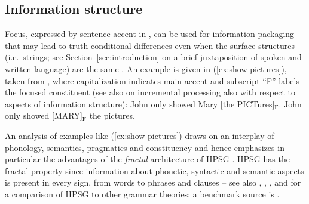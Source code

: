 \documentclass[output=paper
 	        ,biblatex
                ,babelshorthands
                ,newtxmath
                ,draftmode
                ,colorlinks, citecolor=brown
]{langscibook}
\begin{document}
\subsection{Information structure}
\label{sec:information-structure}

Focus, expressed by sentence accent in , can be used for information packaging that may lead to truth-conditional differences even when the surface structures (i.e.\ strings; see Section~\ref{sec:introduction} on a brief juxtaposition of spoken and written language) are the same \citep{Halliday:1967}.
%
An example is given in (\ref{ex:show-pictures}), taken from \citet[]{Krifka:2008}, where capitalization indicates main accent and subscript \enquote{F} labels the focused constituent (see also  on incremental processing also with respect to aspects of information structure):
%
\ea \label{ex:show-pictures}
  \ea John only showed Mary [the PICTures]$_\text{F}$.
  \ex John only showed [MARY]$_\text{F}$ the pictures.
  \z
\z


\noindent An analysis of examples like (\ref{ex:show-pictures}) draws on an interplay of phonology, semantics, pragmatics and constituency and hence emphasizes in particular the advantages of the \emph{fractal} architecture of HPSG \citep{Johnson:Lappin:1999}. 
%
HPSG has the fractal property since
information about phonetic, syntactic and semantic aspects is present in every sign, from words to phrases and clauses \citep[]{Pollard:Sag:1994} -- see also , , ,  and  for a comparison of HPSG to other grammar theories; a benchmark source is \citet{MuellerGT-Eng1}.
\end{document}
